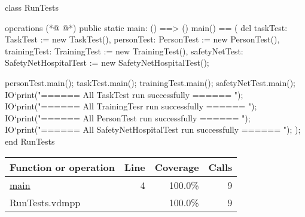 \begin{vdmpp}[breaklines=true]
class RunTests

operations
(*@
\label{main:4}
@*)
 public static main: () ==> ()
   main() == (
    dcl taskTest: TaskTest := new TaskTest(), personTest: PersonTest := new PersonTest(), 
     trainingTest: TrainingTest := new TrainingTest(), safetyNetTest: SafetyNetHospitalTest := new SafetyNetHospitalTest();
    
    personTest.main();
    taskTest.main(); 
    trainingTest.main();
    safetyNetTest.main();
    IO`print("\n\n ====== All TaskTest run successfully ====== \n\n");
    IO`print("\n\n ====== All TrainingTesr run successfully ====== \n\n");
    IO`print("\n\n ====== All PersonTest run successfully ====== \n\n");
   IO`print("\n\n ====== All SafetyNetHospitalTest run successfully ====== \n\n");
   );
end RunTests
\end{vdmpp}
\bigskip
\begin{longtable}{|l|r|r|r|}
\hline
Function or operation & Line & Coverage & Calls \\
\hline
\hline
\hyperref[main:4]{main} & 4&100.0\% & 9 \\
\hline
\hline
RunTests.vdmpp & & 100.0\% & 9 \\
\hline
\end{longtable}

